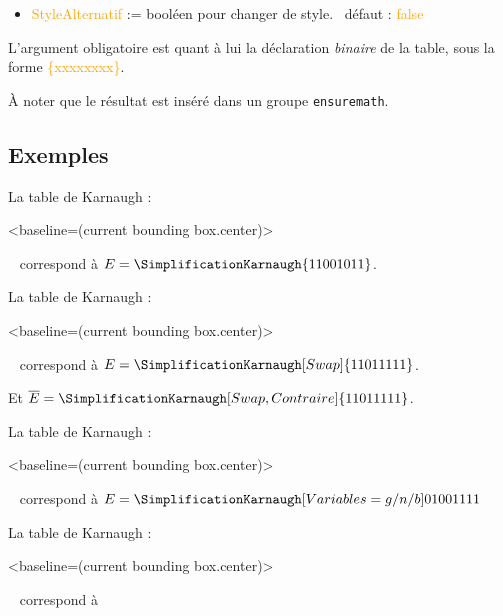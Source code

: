 \documentclass[french,a4paper,11pt]{article}
\newcommand\Cle[1]{{\small\sffamily\textlangle \textcolor{orange}{#1}\textrangle}}
\begin{document}
{{\begin{tipblock}
\begin{itemize}
	\hfill~défaut : \Cle{true}
	\item \Cle{StyleAlternatif} := booléen pour changer de style. \hfill~défaut : \Cle{false}
\end{itemize}

L'argument obligatoire est quant à lui la déclaration \textit{binaire} de la table, sous la forme \Cle{\{xxxxxxxx\}}.

\smallskip

À noter que le résultat est inséré dans un groupe \texttt{ensuremath}.
\end{tipblock}

\subsection{Exemples}

\begin{DemoCode}
La table de Karnaugh :
\begin{TableKarnaugh}<baseline=(current bounding box.center)>
\end{TableKarnaugh}~
correspond à $E=\SimplificationKarnaugh{11001011}$.
\end{DemoCode}

\begin{DemoCode}
La table de Karnaugh :
\begin{TableKarnaugh}[Swap]<baseline=(current bounding box.center)>
\end{TableKarnaugh}~
correspond à $E=\SimplificationKarnaugh[Swap]{11011111}$.

Et $\overline{E}=\SimplificationKarnaugh[Swap,Contraire]{11011111}$.
\end{DemoCode}

\begin{DemoCode}
La table de Karnaugh :
\begin{TableKarnaugh}[Variables={g/n/b}]<baseline=(current bounding box.center)>
\end{TableKarnaugh}~
correspond à $E=\SimplificationKarnaugh[Variables={g/n/b}]{01001111}$
\end{DemoCode}

\begin{DemoCode}
La table de Karnaugh :
\begin{TableKarnaugh}[StyleAlternatif]<baseline=(current bounding box.center)>
\end{TableKarnaugh}~
correspond à 
\end{DemoCode}

}}
\end{document}
